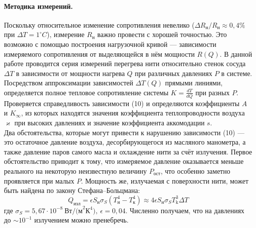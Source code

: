 \documentclass[12pt,a4paper]{article}
\begin{document}
	\paragraph{Методика измерений.} 
	Поскольку относительное изменение сопротивления невелико ($\Delta R_\text{н}/R_\text{н} \approx 0,4\%   $ при $\Delta T = 1 ^\circ C$), измерение $R_\text{н}$ важно провести с хорошей точностью. Это возможно с помощью построения нагрузочной кривой — зависимости измеряемого сопротивления от выделяющейся в нём мощности $R(Q)$. В данной работе проводится серия измерений перегрева нити относительно стенок сосуда $\Delta T$ в зависимости от мощности нагрева $Q$ при различных давлениях $P$ в системе. Посредством аппроксимации зависимостей  $\Delta T(Q)$ прямыми линиями, определяется полное тепловое сопротивление системы $K = \frac{dT}{dQ}$ при разных $P$. Проверяется справедливость зависимости (10) и определяются коэффициенты $A$ и $K_\infty$, из которых находятся значения коэффициента теплопроводности воздуха $\varkappa$ при высоких давлениях и значение коэффициента аккомодации $s$.\\
	
	Два обстоятельства, которые могут привести к нарушению зависимости (10) --- это остаточное давление воздуха, десорбирующегося из масляного манометра, а также давление паров самого масла и охлаждение нити за счёт излучения. Первое обстоятельство приводит к тому, что измеряемое давление оказывается меньше реального на некоторую неизвестную величину $P_\text{ост}$, что особенно заметно проявляется при малых $P$. Мощность же, излучаемая с поверхности нити, может быть найдена по закону Стефана–Больцмана:
	\begin{equation}
	Q_{\text {изл}}=\epsilon S_{\text{н}} \sigma_{S}\left(T_{\text{н}}^{4}-T_{\text{к}}^{4}\right) \approx 4 \epsilon S_{\text{н}} \sigma_{S} T_{\text{k}}^{3} \Delta T
	\end{equation}
	где $\sigma_S = 5,67\cdot 10^{-8}~\text{Вт/(м}^2\text{К}^4),\ \epsilon = 0,04$. Численно получаем, что на давлениях до $\sim 10^{-1}$ излучением можно пренебречь.
\end{document}
